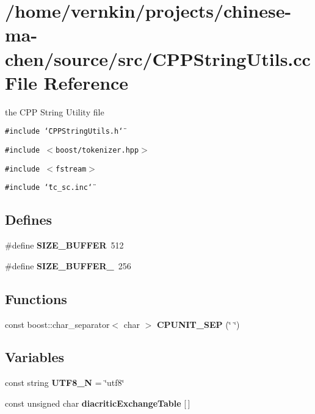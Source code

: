 \section{/home/vernkin/projects/chinese-ma-chen/source/src/CPPStringUtils.cc File Reference}
\label{CPPStringUtils_8cc}
the CPP String Utility file  


{\tt \#include \char`\"{}CPPStringUtils.h\char`\"{}}\par
{\tt \#include $<$boost/tokenizer.hpp$>$}\par
{\tt \#include $<$fstream$>$}\par
{\tt \#include \char`\"{}tc\_\-sc.inc\char`\"{}}\par
\subsection*{Defines}
\begin{CompactItemize}
\item 
\#define \textbf{SIZE\_\-BUFFER}~512\label{CPPStringUtils_8cc_4dea39042071768c1e115b0ebbfc52f2}

\item 
\#define \textbf{SIZE\_\-BUFFER\_}~256\label{CPPStringUtils_8cc_a4577a3eb0be47804f1ec7e20554d163}

\end{CompactItemize}
\subsection*{Functions}
\begin{CompactItemize}
\item 
const boost::char\_\-separator$<$ char $>$ \textbf{CPUNIT\_\-SEP} (\char`\"{} \char`\"{})\label{CPPStringUtils_8cc_704b52ee55bfc9528ac9a84441848f09}

\end{CompactItemize}
\subsection*{Variables}
\begin{CompactItemize}
\item 
const string \textbf{UTF8\_\-N} = \char`\"{}utf8\char`\"{}\label{CPPStringUtils_8cc_4b94e31764062d505344847ad696ac2c}

\item 
const unsigned char \textbf{diacriticExchangeTable} [$\,$]
\end{CompactItemize}


